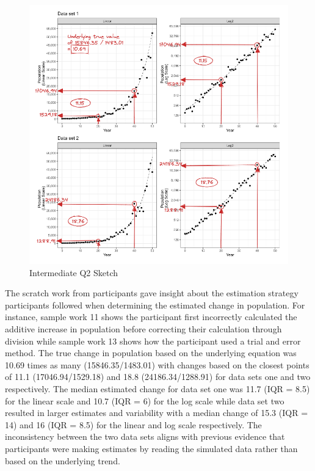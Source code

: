 \documentclass[print]{nuthesis}
\begin{document}
\begin{figure}[tbp]

{\centering \includegraphics[width=1\linewidth,]{images/03-estimation/qi2-sketch} 

}

\caption{Intermediate Q2 Sketch}\label{fig:qi2-sketch}
\end{figure}

The scratch work from participants gave insight about the estimation strategy participants followed when determining the estimated change in population.
For instance, sample work 11 shows the participant first incorrectly calculated the additive increase in population before correcting their calculation through division while sample work 13 shows how the participant used a trial and error method.
The true change in population based on the underlying equation was 10.69 times as many (15846.35/1483.01) with changes based on the closest points of 11.1 (17046.94/1529.18) and 18.8 (24186.34/1288.91) for data sets one and two respectively.
The median estimated change for data set one was 11.7 (IQR = 8.5) for the linear scale and 10.7 (IQR = 6) for the log scale while data set two resulted in larger estimates and variability with a median change of 15.3 (IQR = 14) and 16 (IQR = 8.5) for the linear and log scale respectively.
The inconsistency between the two data sets aligns with previous evidence that participants were making estimates by reading the simulated data rather than based on the underlying trend.
\end{document}
